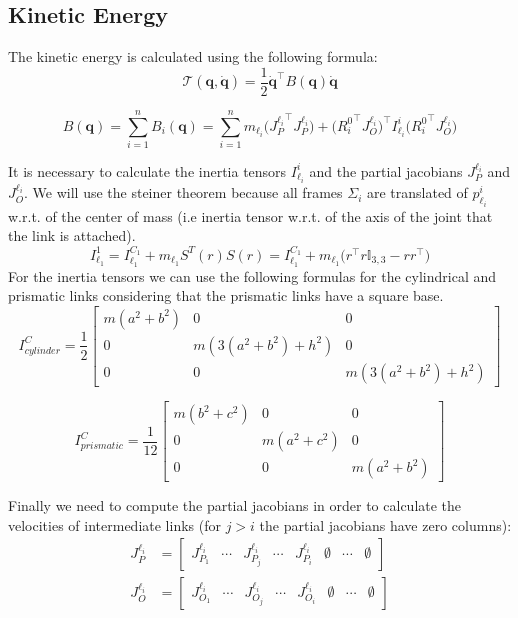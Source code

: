 \documentclass[a4paper,12pt]{article}
\renewcommand*{\l}{\ell}
\newcommand*{\T}{^\top}
\newcommand*{\I}{\mathbb{I}}
\newcommand*{\q}{\bm{q}}
\newcommand*{\dotq}{\dot{\q}}
\begin{document}
\subsection{Kinetic Energy}
The kinetic energy is calculated using the following formula:
\[
\mathcal{T}(\q,\dotq) = \frac{1}{2}\dotq\T B(\q) \dotq
\]

\[
B(\q) = \sum_{i=1}^{n} B_i(\q)
      = \sum_{i=1}^{n} m_{\l_i} \bigl({J^{\l_i}_{P}}\T J^{\l_i}_{P}\bigr)
       +  \bigl({R_i^0}\T J^{\l_i}_{O}\bigr)\T I_{\l_i}^{i} \bigl({R_i^0}\T J^{\l_i}_{O}\bigr)
\]

\noindent It is necessary to calculate the inertia tensors $I_{\l_i}^{i}$ and the partial jacobians $J^{\l_i}_{P}$ and $J^{\l_i}_{O}$. We will use the steiner theorem because all frames $\Sigma_i$ are translated of $p_{\l_i}^{i}$ w.r.t. of the center of mass (i.e inertia tensor w.r.t. of the axis of the joint that the
link is attached).
\[
    I_{\l_1}^{1} = I_{\l_1}^{C_1} + m_{\l_1}S^{T}(r)S(r) = I_{\l_1}^{C_1}  +  m_{\l_1}\bigl(r\T r \I_{3,3}  -  r r\T\bigr) 
\]
For the inertia tensors we can use the following formulas for the cylindrical and prismatic links considering that the prismatic links have a square base.
\[
    I^C_{cylinder} = \frac{1}{2}\begin{bmatrix}
        m(a^2+b^2) & 0 &0 \\
        0 &m(3(a^2+b^2)+h^2)& 0 \\
        0& 0& m(3(a^2+b^2)+h^2)
    \end{bmatrix}
\]

\[
    I^C_{prismatic} = \frac{1}{12}\begin{bmatrix}
        m(b^2+c^2) & 0 &0 \\
        0 &m(a^2+c^2)& 0 \\
        0& 0& m(a^2+b^2)
    \end{bmatrix}
\]

\bigskip
\noindent Finally we need to compute the partial jacobians in order to calculate the velocities of intermediate links (for $j > i$ the partial jacobians have zero columns):
\begin{align*}
    J^{\l_i}_P &= \begin{bmatrix}
        J^{\l_i}_{P_1} & \cdots & J^{\l_i}_{P_j} & \cdots & J^{\l_i}_{P_i} & \emptyset & \cdots & \emptyset
    \end{bmatrix} \\
    J^{\l_i}_O &= \begin{bmatrix}
        J^{\l_i}_{O_1} & \cdots & J^{\l_i}_{O_j} & \cdots & J^{\l_i}_{O_i} & \emptyset & \cdots & \emptyset
    \end{bmatrix}
\end{align*}
\end{document}
